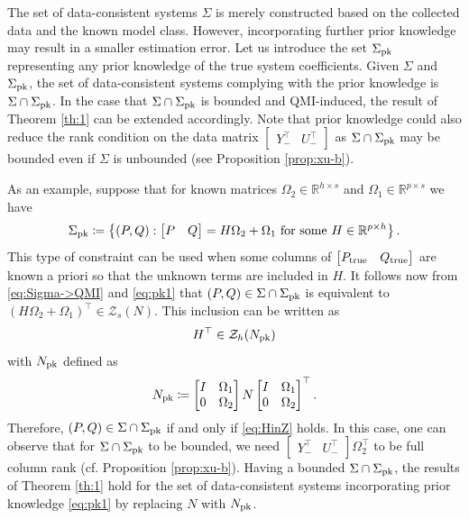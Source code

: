 \documentclass[pdflatex,sn-mathphys-num]{sn-jnl}%
\theoremstyle{thmstyleone}
\begin{document}
The set of data-consistent systems $\Sigma$ is merely constructed based on the collected data and the known model class. However, incorporating further prior knowledge may result in a smaller estimation error. Let us introduce the set $\Sigma_{\textup{pk}}$ representing any prior knowledge of the true system coefficients. Given $\Sigma$ and $\Sigma_{\textup{pk}}$, the set of data-consistent systems complying with the prior knowledge is $\Sigma\cap\Sigma_{\textup{pk}}$.  In the case that $\Sigma\cap\Sigma_{\textup{pk}}$ is bounded and QMI-induced, the result of Theorem \ref{th:1} can be extended accordingly. Note that prior knowledge could also reduce the rank condition on the data matrix $\begin{bmatrix}
Y_-^\top & U_-^\top
\end{bmatrix}$ as $\Sigma\cap\Sigma_{\textup{pk}}$ may be bounded even if $\Sigma$ is unbounded (see Proposition \ref{prop:xu-b}). 

As an example, suppose that for known matrices $\Omega_2\in\mathbb{R}^{h\times s}$ and $\Omega_1\in\mathbb{R}^{p\times s}$ we have
\begin{equation}
\label{eq:pk1}
\Sigma_{\textup{pk}}\coloneqq\left\{(P,Q):\begin{bmatrix}
P & Q
\end{bmatrix}=H\Omega_2+\Omega_1\ \text{for some}\ H\in\mathbb{R}^{p\times h}\right\}.
\end{equation}
This type of constraint can be used when some columns of $\begin{bmatrix}
P_\textup{true} & Q_\textup{true}
\end{bmatrix}$ are known a priori so that the unknown terms are included in $H$. It follows now from \eqref{eq:Sigma->QMI} and \eqref{eq:pk1} that $(P,Q)\in\Sigma\cap \Sigma_{\textup{pk}}$ is equivalent to $(H\Omega_2+\Omega_1)^\top\in\mathcal{Z}_s(N)$. This inclusion can be written as
\begin{equation}
\label{eq:HinZ}
H^\top\in\mathcal{Z}_{h}(N_{\textup{pk}})
\end{equation}
with $N_{\textup{pk}}$ defined as
\begin{equation}
N_{\textup{pk}}\coloneqq \begin{bmatrix}
I & \Omega_1 \\
0 & \Omega_2
\end{bmatrix}N \begin{bmatrix}
I & \Omega_1 \\
0 & \Omega_2
\end{bmatrix}^\top.
\end{equation}
Therefore, $(P,Q)\in\Sigma\cap \Sigma_{\textup{pk}}$ if and only if \eqref{eq:HinZ} holds. In this case, one can observe that for $\Sigma\cap \Sigma_{\textup{pk}}$ to be bounded, we need $\begin{bmatrix}
Y_-^\top & U_-^\top
\end{bmatrix}\Omega_2^\top$ to be full column rank (cf. Proposition \ref{prop:xu-b}). Having a bounded $\Sigma\cap \Sigma_{\textup{pk}}$, the results of Theorem \ref{th:1} hold for the set of data-consistent systems incorporating prior knowledge \eqref{eq:pk1} by replacing $N$ with $N_{\textup{pk}}$.  
\end{document}
